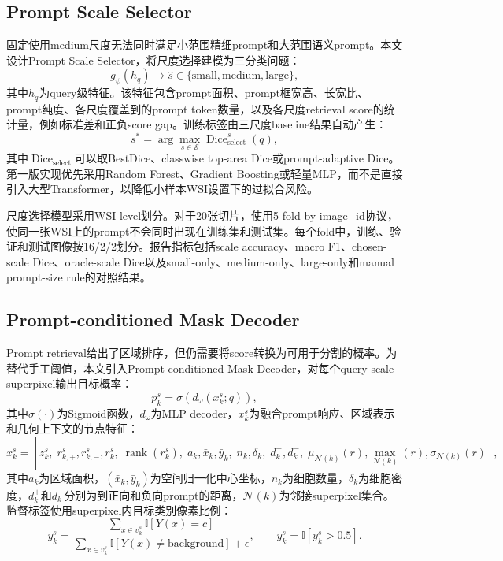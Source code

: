 \documentclass[UTF8]{ctexart}
\begin{document}
\subsection{Prompt Scale Selector}

固定使用medium尺度无法同时满足小范围精细prompt和大范围语义prompt。本文设计Prompt Scale Selector，将尺度选择建模为三分类问题：
\begin{equation}
    g_{\psi}(h_q) \rightarrow \hat{s}\in\{\text{small},\text{medium},\text{large}\},
\end{equation}
其中$h_q$为query级特征。该特征包含prompt面积、prompt框宽高、长宽比、prompt纯度、各尺度覆盖到的prompt token数量，以及各尺度retrieval score的统计量，例如标准差和正负score gap。训练标签由三尺度baseline结果自动产生：
\begin{equation}
    s^{*}=\arg\max_{s\in\mathcal{S}} \operatorname{Dice}_{\text{select}}^{s}(q),
\end{equation}
其中$\operatorname{Dice}_{\text{select}}$可以取BestDice、classwise top-area Dice或prompt-adaptive Dice。第一版实现优先采用Random Forest、Gradient Boosting或轻量MLP，而不是直接引入大型Transformer，以降低小样本WSI设置下的过拟合风险。

尺度选择模型采用WSI-level划分。对于20张切片，使用5-fold by image\_id协议，使同一张WSI上的prompt不会同时出现在训练集和测试集。每个fold中，训练、验证和测试图像按16/2/2划分。报告指标包括scale accuracy、macro F1、chosen-scale Dice、oracle-scale Dice以及small-only、medium-only、large-only和manual prompt-size rule的对照结果。

\subsection{Prompt-conditioned Mask Decoder}

Prompt retrieval给出了区域排序，但仍需要将score转换为可用于分割的概率。为替代手工阈值，本文引入Prompt-conditioned Mask Decoder，对每个query-scale-superpixel输出目标概率：
\begin{equation}
    p_k^s = \sigma\left(d_{\omega}(x_k^s;q)\right),
\end{equation}
其中$\sigma(\cdot)$为Sigmoid函数，$d_{\omega}$为MLP decoder，$x_k^s$为融合prompt响应、区域表示和几何上下文的节点特征：
\begin{equation}
    x_k^s=[
    z_k^s,\;
    r_{k,+}^{s}, r_{k,-}^{s}, r_k^s,\;
    \operatorname{rank}(r_k^s),\;
    a_k,\bar{x}_k,\bar{y}_k,\;
    n_k,\delta_k,\;
    d_k^{+}, d_k^{-},\;
    \mu_{\mathcal{N}(k)}(r),\max_{\mathcal{N}(k)}(r),\sigma_{\mathcal{N}(k)}(r)
    ],
\end{equation}
其中$a_k$为区域面积，$(\bar{x}_k,\bar{y}_k)$为空间归一化中心坐标，$n_k$为细胞数量，$\delta_k$为细胞密度，$d_k^{+}$和$d_k^{-}$分别为到正向和负向prompt的距离，$\mathcal{N}(k)$为邻接superpixel集合。监督标签使用superpixel内目标类别像素比例：
\begin{equation}
    y_k^s =
    \frac{\sum_{x\in v_k^s}\mathbb{I}[Y(x)=c]}
    {\sum_{x\in v_k^s}\mathbb{I}[Y(x)\neq \text{background}] + \epsilon},
    \qquad
    \bar{y}_k^s=\mathbb{I}[y_k^s>0.5].
\end{equation}
\end{document}
